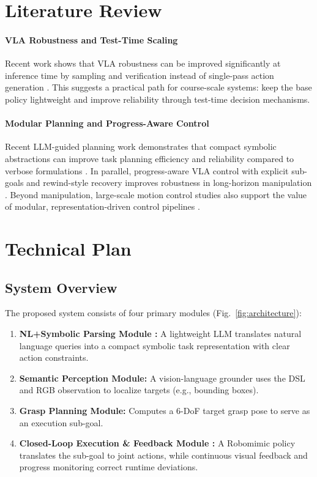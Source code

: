 \documentclass[conference]{IEEEtran}
\begin{document}
\section{Literature Review}
\label{sec:literature}

\paragraph{VLA Robustness and Test-Time Scaling}
Recent work shows that VLA robustness can be improved significantly at inference time by sampling and verification instead of single-pass action generation \cite{robomonkey2025}. This suggests a practical path for course-scale systems: keep the base policy lightweight and improve reliability through test-time decision mechanisms.

\paragraph{Modular Planning and Progress-Aware Control}
Recent LLM-guided planning work demonstrates that compact symbolic abstractions can improve task planning efficiency and reliability compared to verbose formulations \cite{plahx2025}. In parallel, progress-aware VLA control with explicit sub-goals and rewind-style recovery improves robustness in long-horizon manipulation \cite{sprvla2026}. Beyond manipulation, large-scale motion control studies also support the value of modular, representation-driven control pipelines \cite{moconvq2023}.

\section{Technical Plan}
\label{sec:technical}

\subsection{System Overview}
The proposed system consists of four primary modules (Fig.~\ref{fig:architecture}):
\begin{enumerate}
    \item \textbf{NL+Symbolic Parsing Module \cite{plahx2025}:} A lightweight LLM translates natural language queries into a compact symbolic task representation with clear action constraints.
    \item \textbf{Semantic Perception Module:} A vision-language grounder uses the DSL and RGB observation to localize targets (e.g., bounding boxes).
    \item \textbf{Grasp Planning Module:} Computes a 6-DoF target grasp pose to serve as an execution sub-goal.
    \item \textbf{Closed-Loop Execution \& Feedback Module \cite{sprvla2026}:} A Robomimic policy translates the sub-goal to joint actions, while continuous visual feedback and progress monitoring correct runtime deviations.
\end{enumerate}
\end{document}
